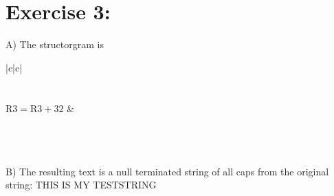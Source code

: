 \documentclass[10pt]{article}
\begin{document}
\section*{Exercise 3:}
A) The structorgram is

\begin{center}
\begin{tabular}{|c|c|}
\hline
{} \\
\hline
{} \\
\hline
{} \\
\hline
$\mathrm{R} 3=\mathrm{R} 3+32$ &  \\
\hline
{} \\
\hline
{} \\
\hline
{} \\
\hline
\end{tabular}
\end{center}

B) The resulting text is a null terminated string of all caps from the original string: THIS IS MY TESTSTRING
\end{document}
